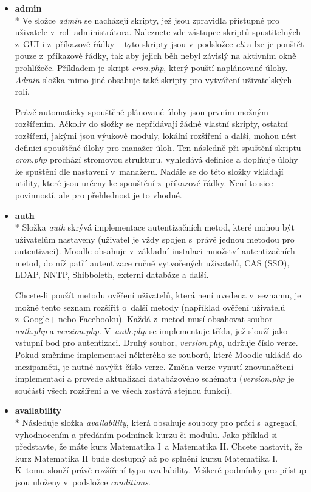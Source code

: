 \documentclass[
print,
  11pt,
  table,   
  nolof,    
  nolot,
  oneside,final
]{fithesis3}
\begin{document}
\begin{itemize}
\item \textbf{admin} \\*
Ve složce \emph{admin} se nacházejí skripty, jež jsou zpravidla přístupné pro uživatele v~roli administrátora. Naleznete zde zástupce skriptů spustitelných z~GUI i z~příkazové řádky – tyto skripty jsou v~podsložce \emph{cli} a lze je pouštět pouze z~příkazové řádky, tak aby jejich běh nebyl závislý na aktivním okně prohlížeče. Příkladem je skript \emph{cron.php}, který pouští naplánované úlohy. \emph{Admin} složka mimo jiné obsahuje také skripty pro vytváření uživatelských rolí. 

Právě automaticky spouštěné plánované úlohy jsou prvním možným rozšířením. Ačkoliv do složky se nepřidávají žádné vlastní skripty, ostatní rozšíření, jakými jsou výukové moduly, lokální rozšíření a další, mohou nést definici spouštěné úlohy pro manažer úloh. Ten následně při spuštění skriptu \emph{cron.php} prochází stromovou strukturu, vyhledává definice a doplňuje úlohy ke spuštění dle nastavení v~manažeru. Nadále se do této složky vkládají utility, které jsou určeny ke spouštění z~příkazové řádky. Není to sice povinností, ale pro přehlednost je to vhodné.

\item \textbf{auth} \\*
Složka \emph{auth} skrývá implementace autentizačních metod, které mohou být uživatelům nastaveny (uživatel je vždy spojen s~právě jednou metodou pro autentizaci). Moodle obsahuje v~základní instalaci množství autentizačních metod, do níž patří autentizace ručně vytvořených uživatelů, CAS (SSO), LDAP, NNTP, Shibboleth, externí databáze a další. 

Chcete-li použít metodu ověření uživatelů, která není uvedena v~seznamu, je možné tento seznam rozšířit o~další metody (například ověření uživatelů z~Google+ nebo Facebooku). Každá z~metod musí obsahovat soubor \emph{auth.php} a \emph{version.php}. V~\emph{auth.php} se implementuje třída, jež slouží jako vstupní bod pro autentizaci. Druhý soubor, \emph{version.php}, udržuje číslo verze. Pokud změníme implementaci některého ze souborů, které Moodle ukládá do mezipaměti, je nutné navýšit číslo verze. Změna verze vynutí znovunačtení implementací a provede aktualizaci databázového schématu (\emph{version.php} je součástí všech rozšíření a ve všech zastává stejnou funkci). 


\item \textbf{availability} \\*
Následuje složka \emph{availability}, která obsahuje soubory pro práci s~agregací, vyhodnocením a předáním podmínek kurzu či modulu. Jako příklad si představte, že máte kurz Matematika I~a Matematika II. Chcete nastavit, že kurz Matematika II bude dostupný až po splnění kurzu Matematika I. K~tomu slouží právě rozšíření typu availability. Veškeré podmínky pro přístup jsou uloženy v~podsložce \emph{conditions}.


\end{itemize}
\end{document}
